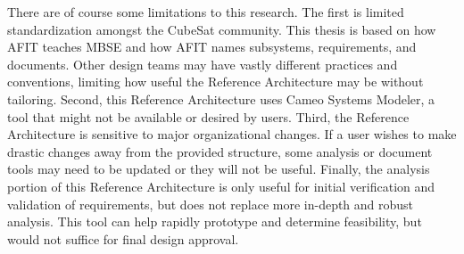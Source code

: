 
    
There are of course some limitations to this research. The first is limited standardization amongst the CubeSat community. This thesis is based on how AFIT teaches MBSE and how AFIT names subsystems, requirements, and documents. Other design teams may have vastly different practices and conventions, limiting how useful the Reference Architecture may be without tailoring. Second, this Reference Architecture uses Cameo Systems Modeler, a tool that might not be available or desired by users. Third, the Reference Architecture is sensitive to major organizational changes. If a user wishes to make drastic changes away from the provided structure, some analysis or document tools may need to be updated or they will not be useful. Finally, the analysis portion of this Reference Architecture is only useful for initial verification and validation of requirements, but does not replace more in-depth and robust analysis. This tool can help rapidly prototype and determine feasibility, but would not suffice for final design approval. 